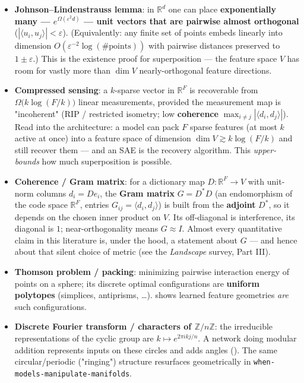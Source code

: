 \begin{itemize}
\item \textbf{Johnson--Lindenstrauss lemma}: in $\mathbb{R}^{d}$ one can place \textbf{exponentially many --- $e^{\Omega(\varepsilon^2 d)}$ --- unit vectors that are pairwise almost orthogonal} ($|\langle u_i,u_j\rangle| < \varepsilon$). (Equivalently: any finite set of points embeds linearly into dimension $O(\varepsilon^{-2}\log(\#\text{points}))$ with pairwise distances preserved to $1\pm\varepsilon$.) This is the existence proof for superposition --- the feature space $V$ has room for vastly more than $\dim V$ nearly-orthogonal feature directions.
\item \textbf{Compressed sensing}: a $k$-sparse vector in $\mathbb{R}^{F}$ is recoverable from $\Omega\!\big(k\log(F/k)\big)$ linear measurements, provided the measurement map is "incoherent" (RIP / restricted isometry; low \textbf{coherence} $\max_{i\ne j}|\langle d_i,d_j\rangle|$). Read into the architecture: a model can pack $F$ sparse features (at most $k$ active at once) into a feature space of dimension $\dim V \gtrsim k\log(F/k)$ and still recover them --- and an SAE is the recovery algorithm. This \emph{upper-bounds} how much superposition is possible.
\item \textbf{Coherence / Gram matrix}: for a dictionary map $D:\mathbb{R}^F\to V$ with unit-norm columns $d_i = D e_i$, the \textbf{Gram matrix} $G = D^{*}D$ (an endomorphism of the code space $\mathbb{R}^F$, entries $G_{ij} = \langle d_i, d_j\rangle$) is built from the \textbf{adjoint} $D^{*}$, so it depends on the chosen inner product on $V$. Its off-diagonal is interference, its diagonal is $1$; near-orthogonality means $G \approx I$. Almost every quantitative claim in this literature is, under the hood, a statement about $G$ --- and hence about that silent choice of metric (see the \emph{Landscape} survey, Part III).
\item \textbf{Thomson problem / packing}: minimizing pairwise interaction energy of points on a sphere; its discrete optimal configurations are \textbf{uniform polytopes} (simplices, antiprisms, \dots{}). \textcite{toy-models-superposition} shows learned feature geometries \emph{are} such configurations.
\item \textbf{Discrete Fourier transform / characters of $\mathbb{Z}/n\mathbb{Z}$}: the irreducible representations of the cyclic group are $k \mapsto e^{2\pi i k j/n}$. A network doing modular addition represents inputs on these circles and adds angles (\textcite{progress-measures-for-grokking}). The same circular/periodic ("ringing") structure resurfaces geometrically in \texttt{when-models-manipulate-manifolds}.

\end{itemize}
